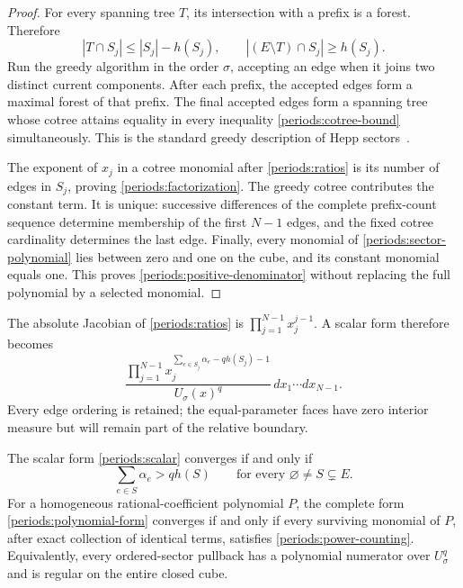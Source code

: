 \begin{proof}
For every spanning tree $T$, its intersection with a prefix is a forest.
Therefore
\begin{equation}
 |T\cap S_j|\le |S_j|-h(S_j),\qquad
 |(E\setminus T)\cap S_j|\ge h(S_j).
 \label{periods:cotree-bound}
\end{equation}
Run the greedy algorithm in the order $\sigma$, accepting an edge when
it joins two distinct current components.  After each prefix, the accepted
edges form a maximal forest of that prefix.  The final accepted edges
form a spanning tree whose cotree attains equality in every inequality
\eqref{periods:cotree-bound} simultaneously.  This is the standard greedy
description of Hepp sectors~\cite[Lemma~2.8]{panzer2023}.

The exponent of $x_j$ in a cotree monomial after
\eqref{periods:ratios} is its number of edges in $S_j$, proving
\eqref{periods:factorization}.  The greedy cotree contributes the constant
term.  It is unique: successive differences of the complete prefix-count
sequence determine membership of the first $N-1$ edges, and the fixed
cotree cardinality determines the last edge.  Finally, every monomial of
\eqref{periods:sector-polynomial} lies between zero and one on the cube,
and its constant monomial equals one.  This proves
\eqref{periods:positive-denominator} without replacing the full polynomial
by a selected monomial.
\end{proof}

The absolute Jacobian of \eqref{periods:ratios} is
$\prod_{j=1}^{N-1}x_j^{j-1}$.  A scalar form therefore becomes
\begin{equation}
 \frac{\prod_{j=1}^{N-1}
 x_j^{\sum_{e\in S_j}\alpha_e-qh(S_j)-1}}
 {U_\sigma(x)^q}\,dx_1\cdots dx_{N-1}.
 \label{periods:scalar-pullback}
\end{equation}
Every edge ordering is retained; the equal-parameter faces have zero
interior measure but will remain part of the relative boundary.

\begin{proposition}
\label{periods:integer-convergence}
The scalar form \eqref{periods:scalar} converges if and only if
\begin{equation}
 \sum_{e\in S}\alpha_e>q h(S)
 \qquad\text{for every }\varnothing\ne S\subsetneq E.
 \label{periods:power-counting}
\end{equation}
For a homogeneous rational-coefficient polynomial $P$, the complete form
\eqref{periods:polynomial-form} converges if and only if every surviving
monomial of $P$, after exact collection of identical terms, satisfies
\eqref{periods:power-counting}.  Equivalently, every ordered-sector
pullback has a polynomial numerator over $U_\sigma^q$ and is regular
on the entire closed cube.
\end{proposition}

